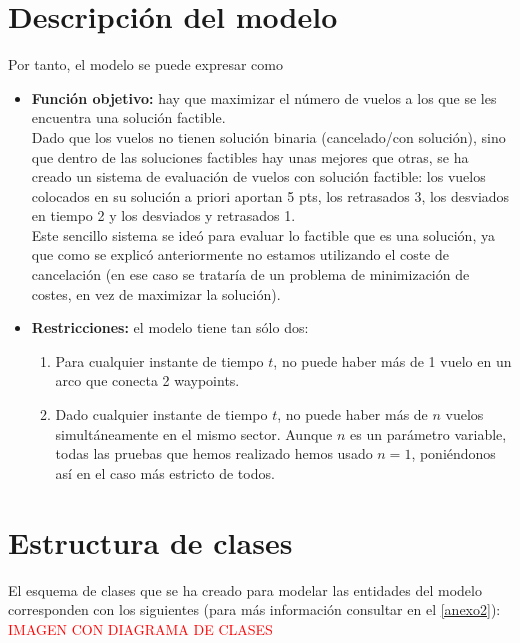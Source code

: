 \section{Descripción del modelo}
Por tanto, el modelo se puede expresar como
\begin{itemize}
	\item \textbf{Función objetivo: }hay que maximizar el número de vuelos a los que se les encuentra una solución factible.\\
	 Dado que los vuelos no tienen solución binaria (cancelado/con solución), sino que dentro de las soluciones factibles hay unas mejores que otras, se ha creado un sistema de evaluación de vuelos con solución factible: los vuelos colocados en su solución a priori aportan 5 pts, los retrasados 3, los desviados en tiempo 2 y los desviados y retrasados 1.\\
	 Este sencillo sistema se ideó para evaluar lo factible que es una solución, ya que como se explicó anteriormente no estamos utilizando el coste de cancelación (en ese caso se trataría de un problema de minimización de costes, en vez de maximizar la solución).
	\item \textbf{Restricciones:} el modelo tiene tan sólo dos:
	\begin{enumerate}
		\item Para cualquier instante de tiempo $t$, no puede haber más de 1 vuelo en un arco que conecta 2 waypoints. 
		\item Dado cualquier instante de tiempo $t$, no puede haber más de $n$ vuelos simultáneamente en el mismo sector. Aunque $n$ es un parámetro variable, todas las pruebas que hemos realizado hemos usado $n=1$, poniéndonos así en el caso más estricto de todos.
	\end{enumerate}
	
	
\end{itemize}

\section{Estructura de clases}
El esquema de clases que se ha creado para modelar las entidades del modelo corresponden con los siguientes (para más información consultar en el \autoref{anexo2}):
\textcolor{red}{IMAGEN CON DIAGRAMA DE CLASES}